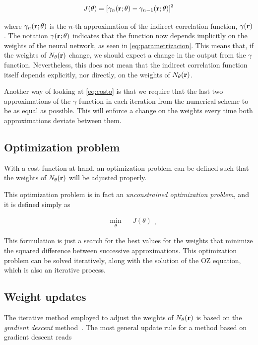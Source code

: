 \begin{equation}
    J(\theta) = \left[\gamma_{n}(\mathbf{r}; \theta) - \gamma_{n-1}(\mathbf{r}; \theta) \right]^2
    \label{eq:costo}
\end{equation}

where $\gamma_{n}(\mathbf{r}; \theta)$ is the $n$-th approximation of the indirect
correlation function, $\gamma(\mathbf{r})$.
The notation $\gamma(\mathbf{r}; \theta)$ indicates that the function now depends implicitly
on the weights of the neural network, as seen in \autoref{eq:parametrizacion}.
This means that, if the weights of $N_{\theta}(\mathbf{r})$ change, we should expect a change in the output
from the $\gamma$ function. Nevertheless, this does not mean that the indirect
correlation function itself depends explicitly, nor directly, on the weights of
$N_{\theta}(\mathbf{r})$.

Another way of looking at \autoref{eq:costo} is that we require that the last 
two approximations of the $\gamma$ function in each iteration from the numerical scheme to 
be as equal as possible. This will enforce a change on the weights every time both 
approximations deviate between them.

\subsection{Optimization problem}
With a cost function at hand, an optimization problem can be defined such that the
weights of $N_{\theta}(\mathbf{r})$ will be adjusted properly.

This optimization problem is in fact an \emph{unconstrained optimization problem},
and it is defined simply as

\begin{equation}
    \begin{aligned}
         & \underset{\theta}{\text{min}}
         & & J(\theta)
    \end{aligned}
    .
    \label{eq:optimizacion}
\end{equation}

This formulation is just a search for the best values for the weights that minimize
the squared difference between successive approximations.
This optimization problem can be solved iteratively, along with the solution of the
OZ equation, which is also an iterative process.

\subsection{Weight updates}
The iterative method employed to adjust the weights of $N_{\theta}(\mathbf{r})$ is based on the
\emph{gradient descent} method~\cite{nocedalNumericalOptimization2006}.
The most general update rule for a method based on gradient descent reads

